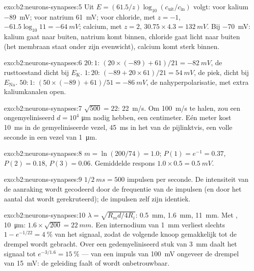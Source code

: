 \begin{solution}{exo:b2:neurons-synapses:5}
Uit $E = (61.5/z)\log_{10}(c_{\text{uit}}/c_{\text{in}})$ volgt:
voor kalium \qty{-89}{mV}; voor natrium \qty{+61}{mV}; voor chloride, met $z =
-1$, $-61.5\log_{10} 11 = \qty{-64}{mV}$; calcium, met $z = 2$,
$30.75\times 4.3 = \qty{+132}{mV}$. Bij \qty{-70}{mV}:
kalium gaat naar buiten, natrium komt binnen, chloride gaat licht naar buiten
(het membraan staat onder zijn evenwicht), calcium komt sterk binnen.
\end{solution}

\begin{solution}{exo:b2:neurons-synapses:6}
$20 : 1$: $(20\times(-89) + 61)/21 = \qty{-82}{mV}$, de rusttoestand dicht
bij $E_{\mathrm K}$. $1 : 20$: $(-89 + 20\times 61)/21 =
\qty{+54}{mV}$, de piek, dicht bij $E_{\mathrm{Na}}$. $50 : 1$: $(50\times
(-89) + 61)/51 = \qty{-86}{mV}$, de nahyperpolarisatie, met extra
kaliumkanalen open.
\end{solution}

\begin{solution}{exo:b2:neurons-synapses:7}
$\sqrt{500} = 22$: \qty{22}{m/s}. Om \qty{100}{m/s} te halen, zou een
ongemyeliniseerd  $d = 10^{4}$ \unit{\micro m} nodig hebben, een
centimeter. Eén meter kost \qty{10}{ms} in de gemyeliniseerde vezel,
\qty{45}{ms} in het  van de pijlinktvis, een volle seconde in een vezel
van \qty{1}{\micro m}.
\end{solution}

\begin{solution}{exo:b2:neurons-synapses:8}
$m = \ln(200/74) = 1.0$; $P(1) = e^{-1} = 0.37$, $P(2) = 0.18$, $P(3)
= 0.06$. Gemiddelde respons $1.0\times 0.5 = \qty{0.5}{mV}$.
\end{solution}

\begin{solution}{exo:b2:neurons-synapses:9}
$1/\qty{2}{ms} = 500$ impulsen per seconde. De intensiteit van de aanraking
wordt gecodeerd door de frequentie van de impulsen (en door het aantal
 dat wordt gerekruteerd); de impulsen zelf zijn identiek.
\end{solution}

\begin{solution}{exo:b2:neurons-synapses:10}
$\lambda = \sqrt{R_m d/4R_i}$: \qty{0.5}{mm}, \qty{1.6}{mm},
\qty{11}{mm}. Met , \qty{10}{\micro m}: $1.6\times\sqrt{200} =
\qty{22}{mm}$. Een internodium van \qty{1}{mm} verliest slechts $1 - e^{-1/22}
= \qty{4}{\%}$ van het signaal, zodat de volgende knoop gemakkelijk tot de
drempel wordt gebracht. Over een gedemyeliniseerd stuk van \qty{3}{mm} daalt
het signaal tot $e^{-3/1.6} = \qty{15}{\%}$ --- van een impuls van
\qty{100}{mV} ongeveer de drempel van \qty{15}{mV}: de geleiding faalt of wordt
onbetrouwbaar.
\end{solution}


